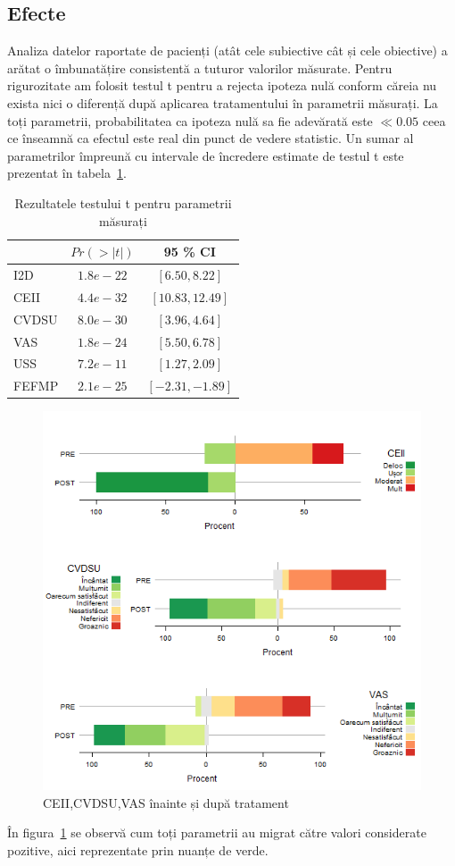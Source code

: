\documentclass[12pt]{article}
\begin{document}
\subsection{Efecte}
  Analiza datelor raportate de pacienți (atât cele subiective cât și cele obiective) a arătat o îmbunatățire consistentă a tuturor valorilor măsurate. Pentru rigurozitate am folosit testul t pentru a rejecta ipoteza nulă conform căreia nu exista nici o diferență după aplicarea tratamentului în parametrii măsurați. La toți parametrii, probabilitatea ca ipoteza nulă sa fie adevărată este $\ll 0.05$ ceea ce înseamnă ca efectul este real din punct de vedere statistic. Un sumar al parametrilor împreună cu intervale de încredere estimate de testul t este prezentat în tabela~\ref{tab:resTestSummary}.
  \begin{table}[H]
    \centering
    \begin{tabular}{|l|c|c|}
      \hline
       & $Pr(>|t|)$ & 95 \% CI \\   \hline
      I2D & 		$1.8e-22$ 	& $[ 6.50, 8.22 ]$ \\ \hline
      CEII & 		$4.4e-32$ 	& $[ 10.83, 12.49 ]$ \\ \hline
      CVDSU & $8.0e-30$ 	& $[ 3.96, 4.64 ]$ \\ \hline
      VAS & 		$1.8e-24$ 	& $[ 5.50, 6.78 ]$ \\ \hline
      USS & 		$7.2e-11$ 	& $[ 1.27, 2.09 ]$ \\ \hline
      FEFMP & $2.1e-25$ 	& $[ -2.31, -1.89 ]$ \\ \hline
    \end{tabular}
    \caption{Rezultatele testului t pentru parametrii măsurați} 
    \label{tab:resTestSummary}
  \end{table}
  \begin{figure}[H]
    \centering
    \includegraphics[width=0.8\linewidth]{incoResVariousStack}
    \caption{\ac{CEII},\ac{CVDSU},\ac{VAS} înainte și după tratament}
    \label{fig:incoResVariousStack}
  \end{figure}
  În figura~\ref{fig:incoResVariousStack} se observă cum toți parametrii au migrat către valori considerate pozitive, aici reprezentate prin nuanțe de verde. 
  
\end{document}
